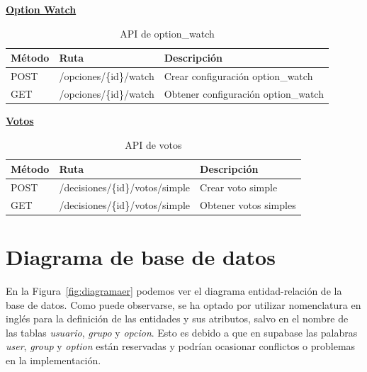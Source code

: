 \textbf{\uline{Option Watch}}
\begin{table}[H]
\centering
\begin{tabular}{l l l}
\toprule
\textbf{Método} & \textbf{Ruta} & \textbf{Descripción} \\
\midrule
POST & /opciones/\{id\}/watch & Crear configuración option\_watch \\
GET  & /opciones/\{id\}/watch & Obtener configuración option\_watch \\
\bottomrule
\end{tabular}
\caption{API de option\_watch}
\end{table}

\textbf{\uline{Votos}}
\begin{table}[H]
\centering
\begin{tabular}{l l l}
\toprule
\textbf{Método} & \textbf{Ruta} & \textbf{Descripción} \\
\midrule
POST & /decisiones/\{id\}/votos/simple      & Crear voto simple \\
GET  & /decisiones/\{id\}/votos/simple      & Obtener votos simples \\
\bottomrule
\end{tabular}
\caption{API de votos}
\end{table}

\section{Diagrama de base de datos}

En la Figura~\ref{fig:diagramaer} podemos ver el diagrama entidad-relación de la base de datos. Como puede observarse, se ha optado por utilizar nomenclatura en inglés para la definición de las entidades y sus atributos, salvo en el nombre de las tablas \textit{usuario}, \textit{grupo} y \textit{opcion}. Esto es debido a que en supabase las palabras \textit{user}, \textit{group} y \textit{option} están reservadas y podrían ocasionar conflictos o problemas en la implementación. \\

